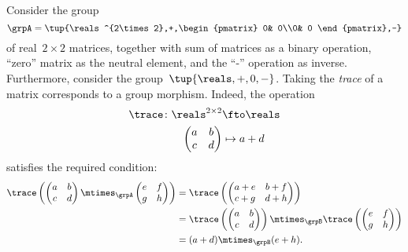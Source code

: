 \begin{example}
    Consider the group
    \begin{equation}
        \grpA=\tup{\reals^{2\times 2},+,\begin{pmatrix}
                                            0& 0\\0& 0
        \end{pmatrix},-}
    \end{equation} of real~$2\times 2$ matrices, together with sum of matrices as a binary operation, ``zero'' matrix as the neutral element, and the ``-'' operation as inverse.
    Furthermore, consider the group~$\tup{\reals,+,0,-}$.
Taking the \emph{trace} of a matrix corresponds to a group morphism.
Indeed, the operation
    \begin{equation*}
        \begin{aligned}
            \trace\colon \reals^{2\times 2}&\fto \reals\\
            \begin{pmatrix}
                a & b \\
                c & d
            \end{pmatrix}&\mapsto a+d
        \end{aligned}
    \end{equation*}
    satisfies the required condition:
    \begin{equation*}
        \begin{aligned}
            \trace \left(\begin{pmatrix}
                             a & b \\
                             c & d
            \end{pmatrix} \mtimes_\grpA \begin{pmatrix}
                                            e & f \\
                                            g & h
            \end{pmatrix} \right)&=\trace \left( \begin{pmatrix}
                                                     a+e & b+f \\
                                                     c+g & d+h
            \end{pmatrix}\right)\\
            &=\trace \left( \begin{pmatrix}
                                a & b \\
                                c & d
            \end{pmatrix}\right)\mtimes_\grpB \trace \left( \begin{pmatrix}
                                                                e & f \\
                                                                g & h
            \end{pmatrix}\right)\\
            &=(a+d)\mtimes_\grpB (e+h).
        \end{aligned}
    \end{equation*}
\end{example}
